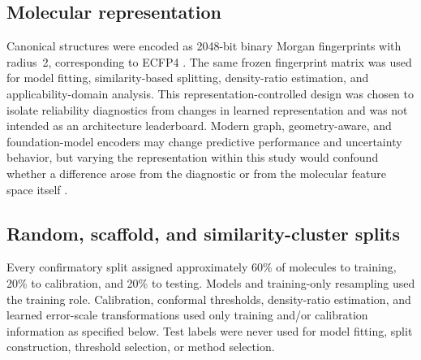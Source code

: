 \begin{table}[!htbp]
\centering
\caption{\textbf{Core endpoint composition after structure cleaning and duplicate resolution.} Classification prevalence is the fraction labeled positive. Regression ranges are reported in the native target scale distributed with MoleculeNet/DeepChem.}
\label{tab:endpoints}
\small
{}
\end{table}

\subsection{Molecular representation}

Canonical structures were encoded as 2048-bit binary Morgan fingerprints with radius~2, corresponding to ECFP4 \citep{rogers2010ecfp}. The same frozen fingerprint matrix was used for model fitting, similarity-based splitting, density-ratio estimation, and applicability-domain analysis. This representation-controlled design was chosen to isolate reliability diagnostics from changes in learned representation and was not intended as an architecture leaderboard. Modern graph, geometry-aware, and foundation-model encoders may change predictive performance and uncertainty behavior, but varying the representation within this study would confound whether a difference arose from the diagnostic or from the molecular feature space itself \citep{heid2024chemprop,fang2022geometry,kim2024quantum,zhao2026revisiting}.

\subsection{Random, scaffold, and similarity-cluster splits}

Every confirmatory split assigned approximately 60\% of molecules to training, 20\% to calibration, and 20\% to testing. Models and training-only resampling used the training role. Calibration, conformal thresholds, density-ratio estimation, and learned error-scale transformations used only training and/or calibration information as specified below. Test labels were never used for model fitting, split construction, threshold selection, or method selection.

